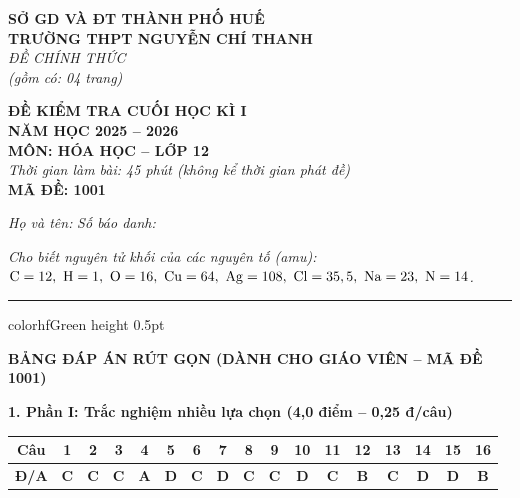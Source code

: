 \documentclass[11pt,a4paper]{article}
\begin{document}
\begin{minipage}[t]{0.48\textwidth}
\textbf{SỞ GD VÀ ĐT THÀNH PHỐ HUẾ}\\
\textbf{TRƯỜNG THPT NGUYỄN CHÍ THANH}\\
\textit{ĐỀ CHÍNH THỨC}\\
\textit{(gồm có: 04 trang)}
\end{minipage}
\hfill
\begin{minipage}[t]{0.48\textwidth}
\raggedleft
\textbf{\color{hfRed}ĐỀ KIỂM TRA CUỐI HỌC KÌ I}\\
\textbf{NĂM HỌC 2025 -- 2026}\\
\textbf{MÔN: HÓA HỌC -- LỚP 12}\\
\textit{Thời gian làm bài: 45 phút (không kể thời gian phát đề)}\\
\textbf{MÃ ĐỀ: 1001}
\end{minipage}

\vspace{4pt}
\noindent
\textit{Họ và tên:} \dotfill \textit{Số báo danh:} \dotfill

\vspace{3pt}
\noindent
\textit{\footnotesize Cho biết nguyên tử khối của các nguyên tố (amu): $\ce{C}=12,\ \ce{H}=1,\ \ce{O}=16,\ \ce{Cu}=64,\ \ce{Ag}=108,\ \ce{Cl}=35,5,\ \ce{Na}=23,\ \ce{N}=14$.}

\vspace{3pt}
\hrule color{hfGreen} height 0.5pt

\vspace{6pt}
\begin{center}
{\Large\textbf{\color{hfRed}BẢNG ĐÁP ÁN RÚT GỌN (DÀNH CHO GIÁO VIÊN -- MÃ ĐỀ 1001)}}
\end{center}

\vspace{2pt}
\noindent
\textbf{\color{mainGreen}1. Phần I: Trắc nghiệm nhiều lựa chọn (4,0 điểm -- 0,25 đ/câu)}
\begin{center}
\renewcommand{\arraystretch}{1.2}
\setlength{\tabcolsep}{3.5pt}
\begin{tabular}{|c|c|c|c|c|c|c|c|c|c|c|c|c|c|c|c|c|}
\hline
\rowcolor{tableGreen}
\textbf{Câu} & \textbf{1} & \textbf{2} & \textbf{3} & \textbf{4} & \textbf{5} & \textbf{6} & \textbf{7} & \textbf{8} & \textbf{9} & \textbf{10} & \textbf{11} & \textbf{12} & \textbf{13} & \textbf{14} & \textbf{15} & \textbf{16} \\
\hline
\textbf{Đ/A} & \textbf{\color{hfRed}C} & \textbf{\color{hfRed}C} & \textbf{\color{hfRed}C} & \textbf{\color{hfRed}A} & \textbf{\color{hfRed}D} & \textbf{\color{hfRed}C} & \textbf{\color{hfRed}D} & \textbf{\color{hfRed}C} & \textbf{\color{hfRed}C} & \textbf{\color{hfRed}D} & \textbf{\color{hfRed}C} & \textbf{\color{hfRed}B} & \textbf{\color{hfRed}C} & \textbf{\color{hfRed}D} & \textbf{\color{hfRed}D} & \textbf{\color{hfRed}B} \\
\hline
\end{tabular}
\end{center}
\end{document}
